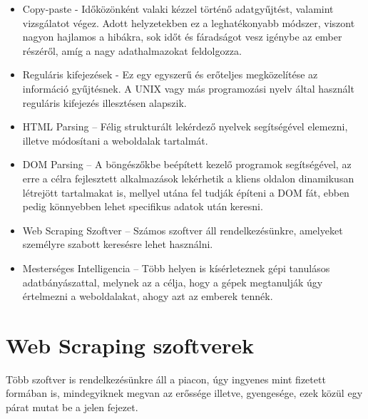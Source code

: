 \begin{itemize}
\item Copy-paste - Időközönként valaki kézzel történő adatgyűjtést, valamint vizsgálatot végez. Adott helyzetekben ez a leghatékonyabb módszer, viszont nagyon hajlamos a hibákra, sok időt és fáradságot vesz igénybe az ember részéről, amíg a nagy adathalmazokat feldolgozza.
\item Reguláris kifejezések - Ez egy egyszerű és erőteljes megközelítése az információ gyűjtésnek. A UNIX vagy más programozási nyelv által használt reguláris kifejezés illesztésen alapszik.
\item HTML Parsing – Félig strukturált lekérdező nyelvek segítségével elemezni, illetve módosítani a weboldalak tartalmát.
\item DOM Parsing – A böngészőkbe beépített kezelő programok segítségével, az erre a célra fejlesztett alkalmazások lekérhetik a kliens oldalon dinamikusan létrejött tartalmakat is, mellyel utána fel tudják építeni a DOM fát, ebben pedig könnyebben lehet specifikus adatok után keresni.
\item Web Scraping Szoftver – Számos szoftver áll rendelkezésünkre, amelyeket személyre szabott keresésre lehet használni. 
\item Mesterséges Intelligencia – Több helyen is kísérleteznek gépi tanulásos adatbányászattal, melynek az a célja, hogy a gépek megtanulják úgy értelmezni a weboldalakat, ahogy azt az emberek tennék.
\end{itemize}

\section{Web Scraping szoftverek}
Több szoftver is rendelkezésünkre áll a piacon, úgy ingyenes mint fizetett formában is, mindegyiknek megvan az erőssége illetve, gyengesége, ezek közül egy párat mutat be a jelen fejezet. 


